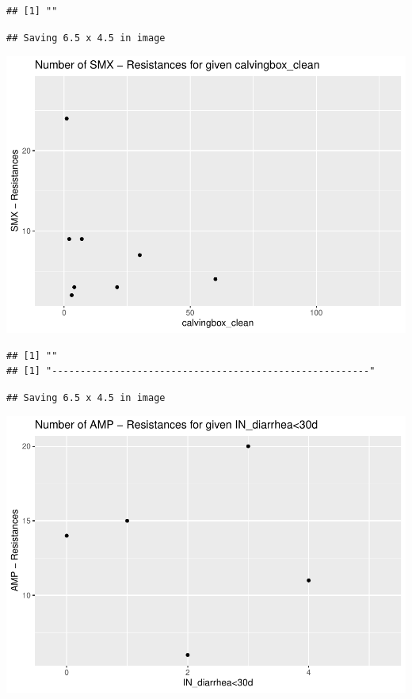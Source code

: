 \documentclass[
]{article}
\begin{document}
\begin{verbatim}
## [1] ""
\end{verbatim}

\begin{verbatim}
## Saving 6.5 x 4.5 in image
\end{verbatim}

\includegraphics{NResistenzen_files/figure-latex/numerical_variables-30.pdf}

\begin{verbatim}
## [1] ""
## [1] "--------------------------------------------------------"
\end{verbatim}

\begin{verbatim}
## Saving 6.5 x 4.5 in image
\end{verbatim}

\includegraphics{NResistenzen_files/figure-latex/numerical_variables-31.pdf}
\end{document}
